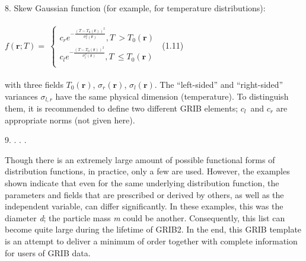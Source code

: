 8. Skew Gaussian function (for example, for temperature distributions):\\
~\\
\(f\left( \mathbf{r};T \right) = \ \left\{ \begin{matrix}
c_{r}e^{- \frac{{(T - T_{0}\left( \mathbf{r} \right))}^{2}}{\sigma_{r}^{2}(\mathbf{r})}},T\  > T_{0}\left( \mathbf{r} \right) \\
c_{l}e^{- \frac{{(T - T_{0}\left( \mathbf{r} \right))}^{2}}{\sigma_{l}^{2}(\mathbf{r})}},T\  \leq T_{0}\left( \mathbf{r} \right) \\
\end{matrix} \right.\ \) (1.11)\\
~\\
with three fields \(T_{0}\left( \mathbf{r} \right)\), \(\sigma_{r}\left( \mathbf{r} \right)\), \(\sigma_{l}\left( \mathbf{r} \right)\). The ``left-sided'' and ``right-sided'' variances \(\sigma_{l,r}\) have the same physical dimension (temperature). To distinguish them, it is recommended to define two different GRIB elements; \(c_{l}\)~and \(c_{r}\) are appropriate norms (not given here).

9. . . .

Though there is an extremely large amount of possible functional forms of distribution functions, in practice, only a few are used. However, the examples shown indicate that even for the same underlying distribution function, the parameters and fields that are prescribed or derived by others, as well as the independent variable, can differ significantly. In these examples, this was the diameter \emph{d}; the particle mass \emph{m} could be another. Consequently, this list can become quite large during the lifetime of GRIB2. In the end, this GRIB template is an attempt to deliver a minimum of order together with complete information for users of GRIB data.
